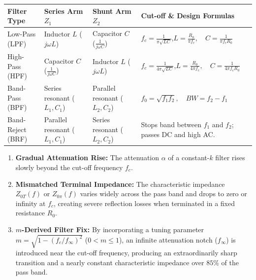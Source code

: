 \documentclass[12pt,a4paper]{article}
\renewcommand{\arraystretch}{1.45}
\begin{document}
\par\vspace{6pt}\noindent
\begingroup
\setlength{\tabcolsep}{4.0pt}
\setlength{\extrarowheight}{2.5pt}
\renewcommand{\arraystretch}{1.25}
\begin{tabularx}{\linewidth}{|B{2.5cm}|B{3.0cm}|B{3.0cm}|Y|}
\hline
\textbf{Filter Type} & \textbf{Series Arm $Z_1$} & \textbf{Shunt Arm $Z_2$} & \textbf{Cut-off \& Design Formulas} \\
\hline
Low-Pass (LPF) & Inductor $L$ ($j\omega L$) & Capacitor $C$ ($\frac{1}{j\omega C}$) & $f_c = \frac{1}{\pi\sqrt{LC}}$,\newline $L = \frac{R_0}{\pi f_c}, \quad C = \frac{1}{\pi f_c R_0}$ \\
\hline
High-Pass (HPF) & Capacitor $C$ ($\frac{1}{j\omega C}$) & Inductor $L$ ($j\omega L$) & $f_c = \frac{1}{4\pi\sqrt{LC}}$,\newline $L = \frac{R_0}{4\pi f_c}, \quad C = \frac{1}{4\pi f_c R_0}$ \\
\hline
Band-Pass (BPF) & Series resonant ($L_1, C_1$) & Parallel resonant ($L_2, C_2$) & $f_0 = \sqrt{f_1 f_2}, \quad BW = f_2 - f_1$ \\
\hline
Band-Reject (BRF) & Parallel resonant ($L_1, C_1$) & Series resonant ($L_2, C_2$) & Stops band between $f_1$ and $f_2$; passes DC and high AC. \\
\hline
\end{tabularx}
\endgroup
\vspace{12pt}

\begin{tcolorbox}[masonbox, title={\textbf{Limitations of Constant-$k$ Filters and Evolution to $m$-Derived Filters}}]
\begin{enumerate}[leftmargin=*]
  \item \textbf{Gradual Attenuation Rise:} The attenuation $\alpha$ of a constant-$k$ filter rises slowly beyond the cut-off frequency $f_c$.
  \item \textbf{Mismatched Terminal Impedance:} The characteristic impedance $Z_{0T}(f)$ or $Z_{0\pi}(f)$ varies widely across the pass band and drops to zero or infinity at $f_c$, creating severe reflection losses when terminated in a fixed resistance $R_0$.
  \item \textbf{$m$-Derived Filter Fix:} By incorporating a tuning parameter $m = \sqrt{1 - (f_c/f_\infty)^2}$ ($0 < m \le 1$), an infinite attenuation notch ($f_\infty$) is introduced near the cut-off frequency, producing an extraordinarily sharp transition and a nearly constant characteristic impedance over $85\%$ of the pass band.
\end{enumerate}
\end{tcolorbox}
\end{document}
